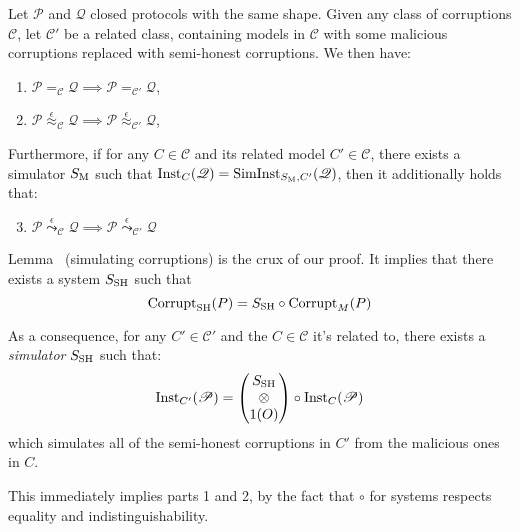 \begin{theorem}
  \label{thm:mal_complete}
  Let $\mathscr{P}$ and $\mathscr{Q}$ closed protocols with the same shape.
  Given any class of corruptions $\mathscr{C}$, let $\mathscr{C}'$ be a related class, containing
  models in $\mathscr{C}$ with some
  malicious corruptions replaced with semi-honest corruptions.
  We then have:
  \begin{enumerate}
    \item $\mathscr{P} =_{\mathscr{C}} \mathscr{Q} \implies \mathscr{P} =_{\mathscr{C}'} \mathscr{Q}$,
    \item $\mathscr{P} \overset{\epsilon}{\approx}_{\mathscr{C}} \mathscr{Q} \implies \mathscr{P} \overset{\epsilon}{\approx}_{\mathscr{C}'} \mathscr{Q}$,
  \end{enumerate}
  Furthermore, if for any $C \in \mathscr{C}$ and its related model $C' \in \mathscr{C}$,
  there exists a simulator $S_{\text{M}}$ such that $\text{Inst}_C(\mathscr{Q}) = \text{SimInst}_{S_{\text{M}}, C'}(\mathscr{Q})$,
  then it additionally holds that:
  \begin{enumerate}
    \setcounter{enumi}{2}
    \item $\mathscr{P} \overset{\epsilon}{\leadsto}_{\mathscr{C}} \mathscr{Q} \implies \mathscr{P} \overset{\epsilon}{\leadsto}_{\mathscr{C}'} \mathscr{Q}$
  \end{enumerate}

   Lemma~\label{thm:simulatingcorruption} (simulating corruptions) is the crux of our proof.
  It implies that there exists a system $S_{\text{SH}}$ such that
  $$
  \text{Corrupt}_{\text{SH}}(P) = S_{\text{SH}} \circ \text{Corrupt}_M(P)
  $$

  As a consequence, for any $C' \in \mathscr{C}'$ and the $C \in \mathscr{C}$ it's related to,
  there exists a \emph{simulator} $S_{\text{SH}}$ such that:
  $$
  \text{Inst}_{C'}(\mathscr{P}) =
  \begin{pmatrix}
    S_{\text{SH}}\cr
    \otimes\cr
    1(O)
  \end{pmatrix}
  \circ \text{Inst}_{C}(\mathscr{P})
  $$
  which simulates all of the semi-honest corruptions in $C'$ from the malicious ones in $C$.

  This immediately implies parts 1 and 2, by the fact that $\circ$ for systems
  respects equality and indistinguishability.


\end{theorem}
